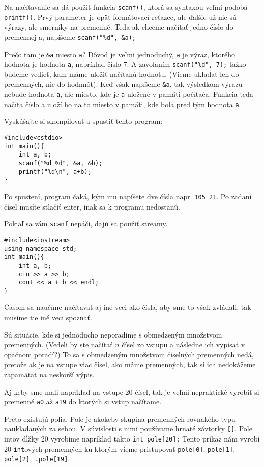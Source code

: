 Na načítavanie sa dá použiť funkcia \verb!scanf()!, ktorá sa syntaxou veľmi
podobá \verb!printf()!. Prvý parameter je opäť formátovací reťazec, ale ďalšie
už nie sú výrazy, ale smerníky na premenné. Teda ak chceme načítať jedno číslo
do premennej a, napíšeme \verb!scanf("%d", &a);!

Prečo tam je \verb!&a! miesto \verb!a!? Dôvod je veľmi jednoduchý, \verb!a! je
výraz, ktorého hodnota je hodnota \verb!a!, napríklad číslo 7.  A zavolaním
\verb!scanf("%d", 7);! ťažko budeme vedieť, kam máme uložiť načítanú hodnotu.
(Vieme ukladať len do premenných, nie do hodnnôt). Keď však napíšeme \verb!&a!,
tak výsledkom výrazu nebude hodnota \verb!a!, ale miesto, kde je \verb!a!
uložené v pamäti počítača.  Funkcia teda načíta číslo a uloží ho na to miesto v
pamäti, kde bola pred tým hodnota \verb!a!.

Vyskúšajte si skompilovať a spustiť tento program:
\begin{lstlisting}
#include<cstdio>
int main(){
    int a, b;
    scanf("%d %d", &a, &b);
    printf("%d\n", a+b);
}
\end{lstlisting}

Po spustení, program čaká, kým mu napíšete dve čísla napr. \verb"105 21". Po
zadaní čísel musíte stlačiť enter, inak sa k programu nedostanú. 

Pokiaľ sa vám \verb!scanf! nepáči, dajú sa použiť streamy.
\begin{lstlisting}
#include<iostream>
using namespace std;
int main(){
    int a, b;
    cin >> a >> b;
    cout << a + b << endl;
}
\end{lstlisting}

Časom sa naučíme načítavať aj iné veci ako čísla, aby sme to však zvládali, tak
musíme tie iné veci spoznať.


Sú situácie, kde si jednoducho neporadíme s obmedzeným množstvom premenných.
(Vedeli by ste načítať $n$ čísel zo vstupu a následne ich vypísať v opačnom
poradí?) To sa s obmedzeným množstvom číselných premenných nedá, pretože ak je
na vstupe viac čísel, ako máme premenných, tak si ich nedokážeme zapamätať na
neskorší výpis. 

Aj keby sme mali napríklad na vstupe 20 čísel, tak je veľmi nepraktické vyrobiť
si premenné \verb!a0! až \verb!a19! do ktorých si vstup načítame.

Preto existujú polia. Pole je akokeby skupina premenných rovnakého typu
naukladaných za sebou.  V súvislosti s nimi používame hrnaté závtorky
\verb![]!. Pole intov dĺžky 20 vyrobíme napríklad takto \verb!int pole[20];!
Tento príkaz nám vyrobí 20 \verb!int!ových premenných ku ktorým vieme pristupovať
\verb!pole[0]!, \verb!pole[1]!, \verb!pole[2]!, \dots \verb!pole[19]!.

